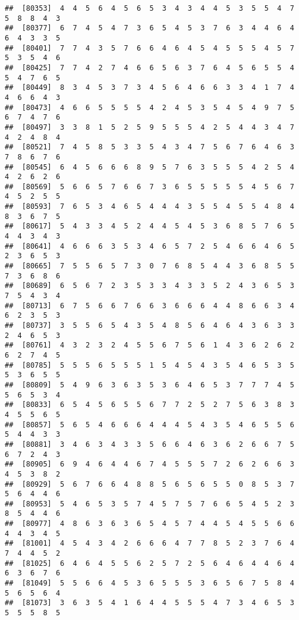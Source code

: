 \documentclass[
]{book}
\begin{document}
\begin{verbatim}
##  [80353]  4  4  5  6  4  5  6  5  3  4  3  4  4  5  3  5  5  4  7  5  8  8  4  3
##  [80377]  6  7  4  5  4  7  3  6  5  4  5  3  7  6  3  4  4  6  4  6  4  3  3  5
##  [80401]  7  7  4  3  5  7  6  6  4  6  4  5  4  5  5  5  4  5  7  5  3  5  4  6
##  [80425]  7  7  4  2  7  4  6  6  5  6  3  7  6  4  5  6  5  5  4  5  4  7  6  5
##  [80449]  8  3  4  5  3  7  3  4  5  6  4  6  6  3  3  4  1  7  4  4  6  6  4  3
##  [80473]  4  6  6  5  5  5  5  4  2  4  5  3  5  4  5  4  9  7  5  6  7  4  7  6
##  [80497]  3  3  8  1  5  2  5  9  5  5  5  4  2  5  4  4  3  4  7  4  2  4  8  4
##  [80521]  7  4  5  8  5  3  3  5  4  3  4  7  5  6  7  6  4  6  3  7  8  6  7  6
##  [80545]  6  4  5  6  6  6  8  9  5  7  6  3  5  5  5  4  2  5  4  4  2  6  2  6
##  [80569]  5  6  6  5  7  6  6  7  3  6  5  5  5  5  5  4  5  6  7  4  5  2  5  5
##  [80593]  7  6  5  3  4  6  5  4  4  4  3  5  5  4  5  5  4  8  4  8  3  6  7  5
##  [80617]  5  4  3  3  4  5  2  4  4  5  4  5  3  6  8  5  7  6  5  4  4  3  4  3
##  [80641]  4  6  6  6  3  5  3  4  6  5  7  2  5  4  6  6  4  6  5  2  3  6  5  3
##  [80665]  7  5  5  6  5  7  3  0  7  6  8  5  4  4  3  6  8  5  5  7  3  6  8  6
##  [80689]  6  5  6  7  2  3  5  3  3  4  3  3  5  2  4  3  6  5  3  7  5  4  3  4
##  [80713]  6  7  5  6  6  7  6  6  3  6  6  6  4  4  8  6  6  3  4  6  2  3  5  3
##  [80737]  3  5  5  6  5  4  3  5  4  8  5  6  4  6  4  3  6  3  3  2  4  6  5  3
##  [80761]  4  3  2  3  2  4  5  5  6  7  5  6  1  4  3  6  2  6  2  6  2  7  4  5
##  [80785]  5  5  5  6  5  5  5  1  5  4  5  4  3  5  4  6  5  3  5  5  3  6  5  5
##  [80809]  5  4  9  6  3  6  3  5  3  6  4  6  5  3  7  7  7  4  5  5  6  5  3  4
##  [80833]  6  5  4  5  6  5  5  6  7  7  2  5  2  7  5  6  3  8  3  4  5  5  6  5
##  [80857]  5  6  5  4  6  6  6  4  4  4  5  4  3  5  4  6  5  5  6  5  4  4  3  3
##  [80881]  3  4  6  3  4  3  3  5  6  6  4  6  3  6  2  6  6  7  5  6  7  2  4  3
##  [80905]  6  9  4  6  4  4  6  7  4  5  5  5  7  2  6  2  6  6  3  4  5  3  8  2
##  [80929]  5  6  7  6  6  4  8  8  5  6  5  6  5  5  0  8  5  3  7  5  6  4  4  6
##  [80953]  5  4  6  5  3  5  7  4  5  7  5  7  6  6  5  4  5  2  3  8  5  4  4  6
##  [80977]  4  8  6  3  6  3  6  5  4  5  7  4  4  5  4  5  5  6  6  4  4  3  4  5
##  [81001]  4  5  4  3  4  2  6  6  6  4  7  7  8  5  2  3  7  6  4  7  4  4  5  2
##  [81025]  6  4  6  4  5  5  6  2  5  7  2  5  6  4  6  4  4  6  4  6  3  6  7  6
##  [81049]  5  5  6  6  4  5  3  6  5  5  5  3  6  5  6  7  5  8  4  5  6  5  6  4
##  [81073]  3  6  3  5  4  1  6  4  4  5  5  5  4  7  3  4  6  5  3  5  5  5  8  5

\end{verbatim}
\end{document}
